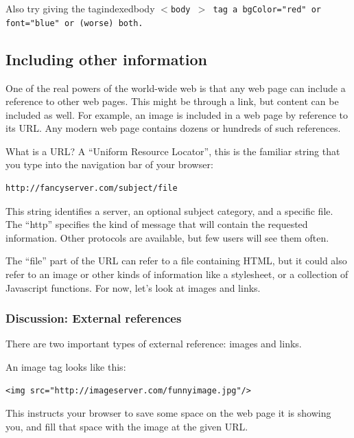 \documentclass[11pt]{article}
\makeatletter
\newcommand{\tag}[2][\relax]{%
  \ifcsname tagindexed#2\endcsname\relax\else%
  \index{#2@\texttt{$<$#2$>$}}%
  \expandafter\gdef\csname tagindexed#2\endcsname{\relax}\fi%
  \bgroup\tt$<$#2\ifx#1\relax\relax\else~#1\fi$>$\egroup}
\makeatother
\begin{document}
Also try giving the \tag{body} tag a \texttt{bgColor="red"} or
\texttt{font="blue"} or (worse) both.


\newpage
\subsection{Including other information}

One of the real powers of the world-wide web is that any web page can
include a reference to other web pages.  This might be through a link,
but content can be included as well.  For example, an image is
included in a web page by reference to its URL.  Any modern web page
contains dozens or hundreds of such references.

What is a URL?  A ``Uniform Resource Locator'', this is the familiar
string that you type into the navigation bar of your browser:

\begin{verbatim}
http://fancyserver.com/subject/file
\end{verbatim}

This string identifies a server, an optional subject category, and a
specific file.  The ``http'' specifies the kind of message that will
contain the requested information.  Other protocols are available, but
few users will see them often.

The ``file'' part of the URL can refer to a file containing HTML, but it
could also refer to an image or other kinds of information like a
stylesheet, or a collection of Javascript functions.  For now, let's
look at images and links.

\subsubsection{Discussion: External references}

There are two important types of external reference: images and links.

An image tag looks like this:

\begin{verbatim}
<img src="http://imageserver.com/funnyimage.jpg"/>
\end{verbatim}

This instructs your browser to save some space on the web page it is
showing you, and fill that space with the image at the given URL.
\end{document}
